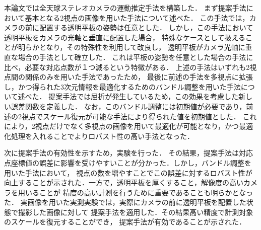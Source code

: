 本論文では全天球ステレオカメラの運動推定手法を構築した．
まず提案手法において基本となる2視点の画像を用いた手法について述べた．
この手法では，カメラの前に配置する透明平板の姿勢は任意とした．
しかし，この手法において透明平板をカメラの光軸と垂直に配置した場合，
特殊なケースとして扱えることが明らかとなり，その特殊性を利用して改良し，
透明平板がカメラ光軸に垂直な場合の手法として確立した．
これは平板の姿勢を任意とした場合の手法に比べ，必要な対応点数が１つ減るという特徴がある．
上述の手法はいずれも2視点間の関係のみを用いた手法であったため，
最後に前述の手法を多視点に拡張し，かつ得られた3次元情報を最適化するためのバンドル調整を用いた手法について述べた．
提案手法では屈折が発生しているため，この効果を考慮した新しい誤差関数を定義した．
なお，このバンドル調整には初期値が必要であり，前述の2視点でスケール復元が可能な手法により得られた値を初期値とした．
これにより，2視点だけでなく多視点の画像を用いて最適化が可能となり，かつ最適化処理を入れることでよりロバスト性の高い手法となった．

次に提案手法の有効性を示すため，実験を行った．
その結果，提案手法は対応点座標値の誤差に影響を受けやすいことが分かった．しかし，バンドル調整を用いた手法において，
視点の数を増やすことでこの誤差に対するロバスト性が向上することが示された．一方で，透明平板を厚くすること，解像度の高いカメラを用いることが
精度の高い計測を行うために重要であることも明らかとなった．
実画像を用いた実測実験では，実際にカメラの前に透明平板を配置した状態で撮影した画像に対して
提案手法を適用した．その結果高い精度で計測対象のスケールを復元することができ，
提案手法が有効であることが示された．

\thispagestyle{empty}

\newpage

